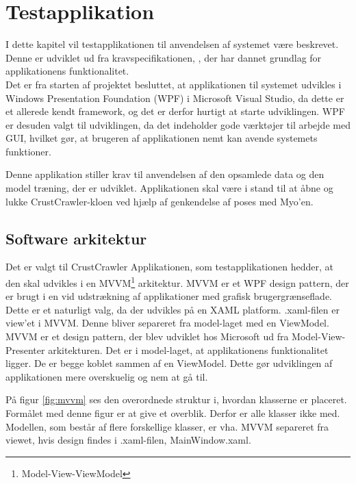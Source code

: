 \thispagestyle{fancy}
\chapter{Testapplikation}
\label{chp:testapp}
I dette kapitel vil testapplikationen til anvendelsen af systemet være beskrevet. Denne er udviklet ud fra kravspecifikationen, \citep{RefWorks:8}, der har dannet grundlag for applikationens funktionalitet. \\
Det er fra starten af projektet besluttet, at applikationen til systemet udvikles i Windows Presentation Foundation (WPF) i Microsoft Visual Studio, da dette er et allerede kendt framework, og det er derfor hurtigt at starte udviklingen. WPF er desuden valgt til udviklingen, da det indeholder gode værktøjer til arbejde med GUI, hvilket gør, at brugeren af applikationen nemt kan avende systemets funktioner.

Denne applikation stiller krav til anvendelsen af den opsamlede data og den model træning, der er udviklet. Applikationen skal være i stand til at åbne og lukke CrustCrawler-kloen ved hjælp af genkendelse af poses med Myo'en.

\section{Software arkitektur}
Det er valgt til CrustCrawler Applikationen, som testapplikationen hedder, at den skal udvikles i en MVVM\footnote{Model-View-ViewModel} arkitektur\citep{RefWorks:14}. MVVM er et WPF design pattern, der er brugt i en vid udstrækning af applikationer med grafisk brugergrænseflade. Dette er et naturligt valg, da der udvikles på en XAML platform. .xaml-filen er view'et i MVVM. Denne bliver separeret fra model-laget med en ViewModel. MVVM er et design pattern, der blev udviklet hos Microsoft ud fra Model-View-Presenter arkitekturen\citep{mvp}. Det er i model-laget, at applikationens funktionalitet ligger. De er begge koblet sammen af en ViewModel. Dette gør udviklingen af applikationen mere overskuelig og nem at gå til.


På figur \ref{fig:mvvm} ses den overordnede struktur i, hvordan klasserne er placeret. Formålet med denne figur er at give et overblik. Derfor er alle klasser ikke med. Modellen, som består af flere forskellige klasser, er vha. MVVM separeret fra viewet, hvis design findes i .xaml-filen, MainWindow.xaml.

